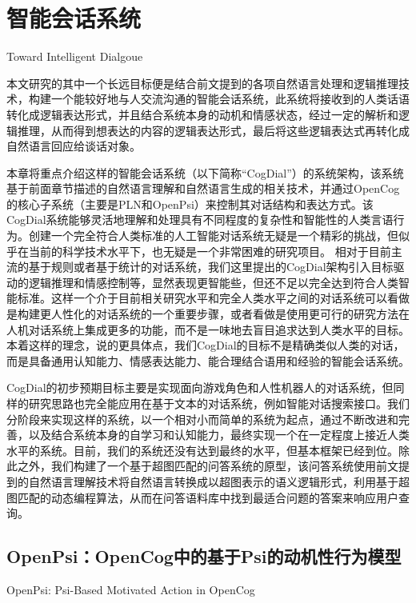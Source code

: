 \chapter{智能会话系统}{Toward Intelligent Dialgoue}

         本文研究的其中一个长远目标便是结合前文提到的各项自然语言处理和逻辑推理技术，构建一个能较好地与人交流沟通的智能会话系统，此系统将接收到的人类话语转化成逻辑表达形式，并且结合系统本身的动机和情感状态，经过一定的解析和逻辑推理，从而得到想表达的内容的逻辑表达形式，最后将这些逻辑表达式再转化成自然语言回应给谈话对象。

       本章将重点介绍这样的智能会话系统（以下简称“CogDial”）的系统架构，该系统基于前面章节描述的自然语言理解和自然语言生成的相关技术，并通过OpenCog的核心子系统（主要是PLN和OpenPsi）来控制其对话结构和表达方式。该CogDial系统能够灵活地理解和处理具有不同程度的复杂性和智能性的人类言语行为。创建一个完全符合人类标准的人工智能对话系统无疑是一个精彩的挑战，但似乎在当前的科学技术水平下，也无疑是一个非常困难的研究项目。 相对于目前主流的基于规则或者基于统计的对话系统，我们这里提出的CogDial架构引入目标驱动的逻辑推理和情感控制等，显然表现更智能些，但还不足以完全达到符合人类智能标准。这样一个介于目前相关研究水平和完全人类水平之间的对话系统可以看做是构建更人性化的对话系统的一个重要步骤，或者看做是使用更可行的研究方法在人机对话系统上集成更多的功能，而不是一味地去盲目追求达到人类水平的目标。本着这样的理念，说的更具体点，我们CogDial的目标不是精确类似人类的对话，而是具备通用认知能力、情感表达能力、能合理结合语用和经验的智能会话系统。

         CogDial的初步预期目标主要是实现面向游戏角色和人性机器人的对话系统，但同样的研究思路也完全能应用在基于文本的对话系统，例如智能对话搜索接口。我们分阶段来实现这样的系统，以一个相对小而简单的系统为起点，通过不断改进和完善，以及结合系统本身的自学习和认知能力，最终实现一个在一定程度上接近人类水平的系统。目前，我们的系统还没有达到最终的水平，但基本框架已经到位。除此之外，我们构建了一个基于超图匹配的问答系统的原型，该问答系统使用前文提到的自然语言理解技术将自然语言转换成以超图表示的语义逻辑形式，利用基于超图匹配的动态编程算法，从而在问答语料库中找到最适合问题的答案来响应用户查询。



\section{OpenPsi：OpenCog中的基于Psi的动机性行为模型}{OpenPsi: Psi-Based Motivated Action in OpenCog}

